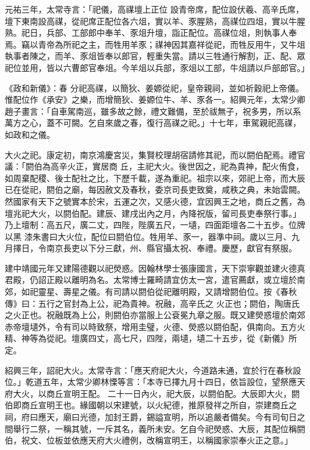 \begin{pinyinscope}
 元祐三年，太常寺言：「祀儀，高禖壇上正位
 設青帝席，配位設伏羲、高辛氏席，壇下東南設高禖，從祀席正配位各六俎，實以羊、豕腥熟，高禖位四俎，實以牛腥熟。祀日，兵部、工部郎中奉羊、豕俎升壇，詣正配位。高禖位俎，則執事人奉焉。竊以青帝為所祀之主，而牲用羊豕；禖神因其嘉祥從祀，而牲反用牛，又牛俎執事者陳之，而羊、豕俎皆奉以郎官，輕重失當。請以三牲通行解割，正、配、眾祀位並用，皆以六曹郎官奉俎。今羊俎以兵部，豕俎以工部，牛俎請以戶部郎官。」



 《政和新儀》：春
 分祀高禖，以簡狄、姜嫄從祀，皇帝親祠，並如祈穀祀上帝儀。惟配位作《承安》之樂，而增簡狄、姜嫄位牛、羊、豕各一。紹興元年，太常少卿趙子畫言：「自車駕南巡，雖多故之餘，禮文難備，至於祓無子，祝多男，所以系萬方之心，蓋不可闕。乞自來歲之春，復行高禖之祀。」十七年，車駕親祀高禖，如政和之儀。



 大火之祀。康定初，南京鴻慶宮災，集賢校理胡宿請修其祀，而以閼伯配焉。禮官議：「閼伯為高辛火正，實居商
 丘，主祀大火。後世因之，祀為貴神，配火侑食，如周棄配稷、後士配社之比，下歷千載，遂為重祀。祖宗以來，郊祀上帝，而大辰已在從祀，閼伯之廟，每因赦文及春秋，委京司長吏致奠，咸秩之典，未始雲闕。然國家有天下之號實本於宋，五運之次，又感火德，宜因興王之地，商丘之舊，為壇兆祀大火，以閼伯配。建辰、建戌出內之月，內降祝版，留司長吏奉祭行事。」乃上壇制：高五尺，廣二丈，四陛，陛廣五尺，一壝，四面距壇各二十五步。位牌以黑
 漆朱書曰大火位，配位曰閼伯位。牲用羊、豕一，器準中祠。歲以三月、九月擇日，令南京長吏以下分三獻，州、縣官攝太祝、奉禮。慶歷，獻官有祭服。



 建中靖國元年又建陽德觀以祀熒惑。因翰林學士張康國言，天下崇寧觀並建火德真君殿，仍詔正殿以離明為名。太常博士羅畸請宜仿太一宮，遣官薦獻，或立壇於南郊，如祀靈星、壽星之儀。有司請以閼伯從祀離明殿，又請增閼伯位。按《春秋傳》曰：五行之官封為上公，祀為貴神。祝融，高辛氏之
 火正也；閼伯，陶唐氏之火正也。祝融既為上公，則閼伯亦當服上公袞冕九章之服。既又建熒惑壇於南郊赤帝壇壝外，令有司以時致祭，增用圭璧，火德、熒惑以閼伯配，俱南向。五方火精、神等為從祀。壇廣四丈，高七尺，四陛，兩壝，壝二十五步，從《新儀》所定。



 紹興三年，詔祀大火。太常寺言：「應天府祀大火，今道路未通，宜於行在春秋設位。」乾道五年，太常少卿林慄等言：「本寺已擇九月十四日，依旨設位，望祭應天府大火，以商丘宣明王配。
 二十一日內火，祀大辰，以閼伯配。大辰即大火，閼伯即商丘宣明王也。緣國朝以宋建號，以火紀德，推原發祥之所自，崇建商丘之祠，府曰應天，廟曰光德，加封王爵，錫謚宣明，所以追嚴者備矣。今有司旬日之間舉行二祭，一稱其號，一斥其名，義所未安。乞自今祀熒惑、大辰，其配位稱閼伯，祝文、位板並依應天府大火禮例，改稱宣明王，以稱國家崇奉火正之意。」




\end{pinyinscope}
